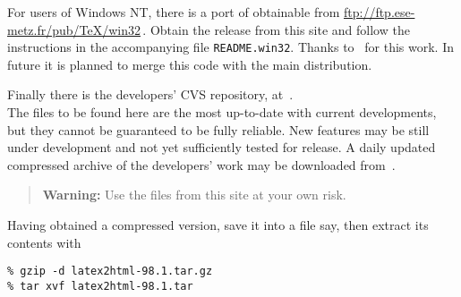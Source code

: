 \bigskip
{}%
\noindent
{}\begin{changebar}%
For users of Windows NT, there is a port of \latextohtml{} obtainable
from \url{ftp://ftp.ese-metz.fr/pub/TeX/win32}\,. Obtain the release from
this site and follow the instructions in the accompanying file
\texttt{README.win32}. \html{\\}Thanks to \Popineau\ for this work.\html{\\}
In future it is planned to merge this code with the main distribution.
\end{changebar}

\bigskip
{}\label{cvsrepos}%
\noindent
{}\begin{changebar}%
Finally there is the \latextohtml{} developers' CVS repository, at \CVSrepos\,.\\
The files to be found here are the most up-to-date with current developments,
but they cannot be guaranteed to be fully reliable. New features may be
still under development and not yet sufficiently tested for release.
A daily updated compressed archive of the developers' work may be
downloaded from \CVSlatest\,.

\begin{quote}
\textbf{Warning: }Use the files from this site at your own risk.
\end{quote}%
\end{changebar}

\htmlrule{}%
\medskip\noindent
Having obtained a compressed  version, save it into a file
 say,
then extract its contents with
\begin{small}
\begin{verbatim}
% gzip -d latex2html-98.1.tar.gz
% tar xvf latex2html-98.1.tar
\end{verbatim}
\end{small}
%

